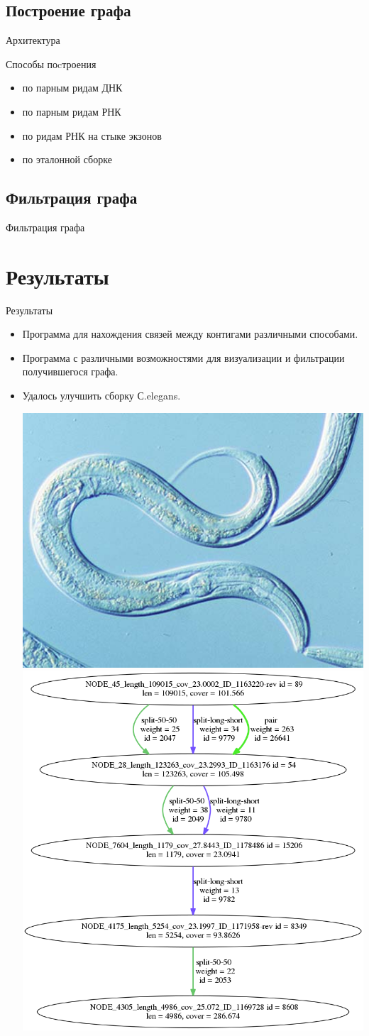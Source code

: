 \documentclass{beamer}
\newcommand{\cimg}[2]{%
	\begin{center}%
		\ifthenelse{\equal{#2}{}}{%
			\texttt{[image: \#1]}
		}{%
			\texttt{[image: \#1]}
		}%
	\end{center}%
}
\begin{document}
\subsection{Построение графа}
\begin{frame}[t]{Архитектура}
\cimg{BuilderClassDiagram.jpg}{1}	
\end{frame}
\begin{frame}[t]{Способы поcтроения}
\begin{itemize}
	\item по парным ридам ДНК
	\item по парным ридам РНК
	\item по ридам РНК на стыке экзонов
	\item по эталонной сборке
\end{itemize}
\cimg{p5.png}{1.21}
\end{frame}

\subsection{Фильтрация графа}
\begin{frame}[t]{Фильтрация графа}
	\cimg{FilterClassDiagram.jpg}{1}
\end{frame}

\section{Результаты}
\begin{frame}[t]{Результаты}
	\begin{itemize}
		\item Программа для нахождения связей
		между контигами различными способами. 
		\item Программа с различными возможностями для 
		визуализации и фильтрации получившегося графа. 
		\item Удалось улучшить сборку С.elegans.
		\begin{center}
		\includegraphics[width=0.35\linewidth]{celegans.jpg}
		\includegraphics[width=0.35\linewidth]{celegExmp.png}
		\end{center}
	\end{itemize}
\end{frame}
\end{document}
